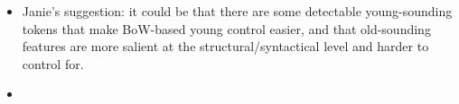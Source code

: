 \begin{itemize}
    \item Janie's suggestion: it could be that there are some detectable young-sounding tokens that make BoW-based young control easier, and that old-sounding features are more salient at the structural/syntactical level and harder to control for.
    \item {}
\end{itemize}

